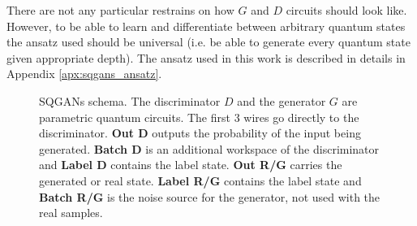 There are not any particular restrains on how $G$ and $D$ circuits should look
like. However, to be able to learn and differentiate between arbitrary quantum
states the ansatz used should be universal (i.e. be able to generate every
quantum state given appropriate depth). The ansatz used in this
work is described in details in Appendix \ref{apx:sqgans_ansatz}.

\begin{figure}[htbp!]
  \caption{SQGANs schema. The discriminator $D$ and the generator $G$ are
    parametric quantum circuits. The first 3 wires go
    directly to the discriminator. \textbf{Out D} outputs the probability of the
  input being generated. \textbf{Batch D} is an additional workspace of the
  discriminator and \textbf{Label D} contains the label state. \textbf{Out R/G}
  carries the generated or real state. \textbf{Label R/G} contains the label
  state and \textbf{Batch R/G} is the noise source for the generator, not used
  with the real samples.\label{fig:SQGANs_circuit} }
\end{figure}

